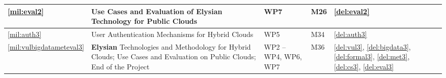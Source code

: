 \documentclass[a4paper,11pt]{article}
\newcommand{\project}[1]{\textbf{#1}\xspace}
\newcommand{\SECURITY}{\project{Elysian}}
\newcommand{\TheProject}{\SECURITY}
\begin{document}
\begin{minipage}{\textwidth}
\begin{center}
\begin{tabular*}{\textwidth}{|p{1cm}|p{10.3cm}|p{1.2cm}|p{0.6cm}|p{2.7cm}|}
   \hline
   \ref{mil:eval2} & Use Cases and Evaluation of \TheProject{} Technology for Public Clouds & WP7 & M26 & \ref{del:eval2} \\
   \hline
   \ref{mil:auth3} & User Authentication Mechanisms for Hybrid Clouds & WP5 & M34 & \ref{del:auth3} \\
   \hline
   \ref{mil:vulbigdatameteval3} & \TheProject{} Technologies and Methodology for Hybrid Clouds; Use Cases and Evaluation on Public Clouds; End of the Project & WP2 -- WP4, WP6, WP7 & M36 & \ref{del:vul3}, \ref{del:bigdata3}, \ref{del:formal3}, \ref{del:met3}, \ref{del:cs3}, \ref{del:eval3} \\
   \hline
   
\end{tabular*}
\end{center}
\end{minipage}
\end{document}

